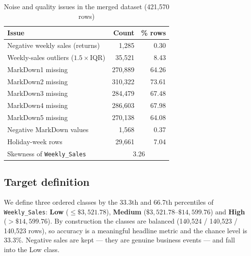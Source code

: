 \begin{table}[!t]
\caption{Noise and quality issues in the merged dataset (421{,}570 rows)}
\label{tab:noise}
\centering
\begin{tabular}{lrr}
\toprule
Issue & Count & \% rows \\
\midrule
Negative weekly sales (returns) & 1{,}285 & 0.30 \\
Weekly-sales outliers ($1.5\times$IQR) & 35{,}521 & 8.43 \\
MarkDown1 missing & 270{,}889 & 64.26 \\
MarkDown2 missing & 310{,}322 & 73.61 \\
MarkDown3 missing & 284{,}479 & 67.48 \\
MarkDown4 missing & 286{,}603 & 67.98 \\
MarkDown5 missing & 270{,}138 & 64.08 \\
Negative MarkDown values & 1{,}568 & 0.37 \\
Holiday-week rows & 29{,}661 & 7.04 \\
Skewness of \texttt{Weekly\_Sales} & \multicolumn{2}{c}{3.26} \\
\bottomrule
\end{tabular}
\end{table}

\subsection{Target definition}
We define three ordered classes by the 33.3th and 66.7th percentiles of \texttt{Weekly\_Sales}: \textbf{Low} ($\le\$3{,}521.78$), \textbf{Medium} ($\$3{,}521.78$--$\$14{,}599.76$) and \textbf{High} ($>\$14{,}599.76$). By construction the classes are balanced (140{,}524 / 140{,}523 / 140{,}523 rows), so accuracy is a meaningful headline metric and the chance level is 33.3\%. Negative sales are kept --- they are genuine business events --- and fall into the Low class.

